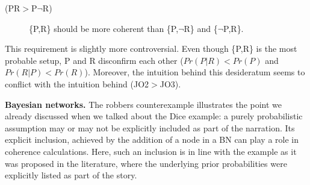 \documentclass[
  10pt,
]{scrartcl}
\newcommand{\s}[1]{\textsf{#1}}
\begin{document}
\begin{description}
    \item[(\s{PR}$>$\s{P}$\neg$\s{R})] \{\s{P,R}\} should be more coherent than \{\s{P},$\neg$\s{R}\} and \{$\neg$\s{P},\s{R}\}.
\end{description}\vspace{2mm}

\noindent  This requirement is slightly more controversial. Even though \{\s{P,R}\} is the most probable setup, \s{P} and \s{R} disconfirm each other (\(Pr(P|R)<Pr(P)\) and \(Pr(R|P)<Pr(R)\)). Moreover, the intuition behind this desideratum seems to conflict with the intuition behind (\s{JO2}\(>\)\s{JO3}).

\textbf{Bayesian networks.} The robbers counterexample illustrates the point we already discussed when we talked about the Dice example: a purely probabilistic assumption may or may not be explicitly included as part of the narration. Its explicit inclusion, achieved by the addition of a node in a BN can play a role in coherence calculations. Here, such an inclusion is in line with the example as it was proposed in the literature, where the underlying prior probabilities were explicitly listed as part of the story.

\vspace{1mm}
\footnotesize

\normalsize
\end{document}
